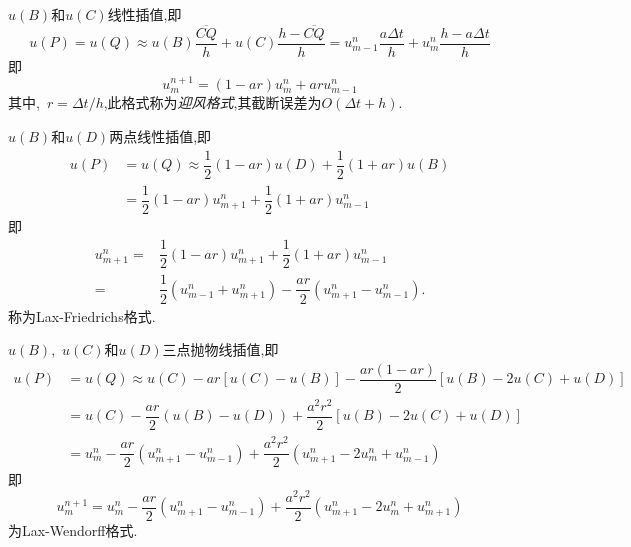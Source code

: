 \begin{asparaenum}
\item $u(B)$和$u(C)$线性插值,即
\begin{equation}
u(P)=u(Q)\approx u(B)\dfrac{\overline{CQ}}{h}+u(C)\dfrac{h-\overline{CQ}}{h}=u_{m-1}^n\dfrac{
a\Delta t}{h}+u_m^n\dfrac{h-a\Delta t}{h}
\end{equation}
即
\begin{equation}\label{eq:04_dl_yf}
 u_m^{n+1}=(1-ar)u_m^n+aru_{m-1}^n
\end{equation}
其中,~$r=\Delta t/h$,此格式称为\emph{迎风格式},其截断误差为$O(\Delta t+h)$.
\item $u(B)$和$u(D)$两点线性插值,即
\begin{equation}
\begin{split}
u(P)&=u(Q)\approx\dfrac{1}{2}(1-ar)u(D)+\dfrac{1}{2}(1+ar)u(B) \\
    &=\dfrac{1}{2}(1-ar)u_{m+1}^n+\dfrac{1}{2}(1+ar)u_{m-1}^n
\end{split}
\end{equation}
即
\begin{equation}\label{eq:04_dl_laxf}
\begin{split}
u_{m+1}^n =& \dfrac{1}{2}(1-ar)u_{m+1}^n+\dfrac{1}{2}(1+ar)u_{m-1}^n \\
          =& \dfrac{1}{2}(u_{m-1}^n+u_{m+1}^n)-\dfrac{ar}{2}(u_{m+1}^n-u_{m-1}^n).
\end{split}
\end{equation}
称为Lax-Friedrichs格式.
\item $u(B)$,~$u(C)$和$u(D)$三点抛物线插值,即
\begin{equation}
\begin{split}
u(P)&=u(Q)\approx u(C)-ar[u(C)-u(B)]-\dfrac{ar(1-ar)}{2}[u(B)-2u(C)+u(D)] \\
    &=u(C)-\dfrac{ar}{2}(u(B)-u(D))+\dfrac{a^2 r^2}{2}[u(B)-2u(C)+u(D)] \\
    &=u_m^n-\dfrac{ar}{2}(u_{m+1}^n-u_{m-1}^n)+\dfrac{a^2 r^2}{2}(u_{m+1}^n
    -2u_m^n+u_{m-1}^n)
\end{split}
\end{equation}
即
\begin{equation}\label{eq:04_dl_laxw}
u_m^{n+1}=u_m^n-\dfrac{ar}{2}(u_{m+1}^n-u_{m-1}^n)+\dfrac{a^2 r^2}{2}
(u_{m+1}^n-2u_m^n+u_{m+1}^n)
\end{equation}
为Lax-Wendorff格式.
\end{asparaenum}\par
